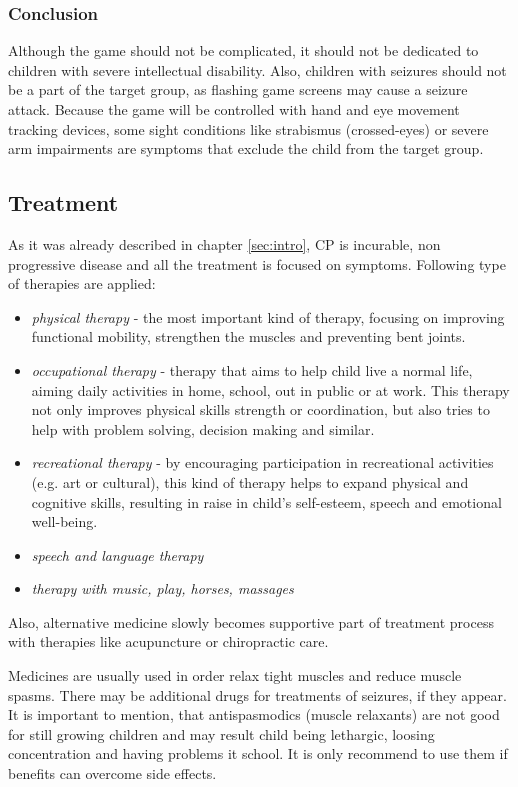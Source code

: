 \subsubsection*{Conclusion}
Although the game should not be complicated, it should not be dedicated to children with severe intellectual disability. Also, children with seizures should not be a part of the target group, as flashing game screens may cause a seizure attack. Because the game will be controlled with hand and eye movement tracking devices, some sight conditions like strabismus (crossed-eyes) or severe arm impairments are symptoms that exclude the child from the target group.

\subsection{Treatment}
As it was already described in chapter \ref{sec:intro}, CP is incurable, non progressive disease and all the treatment is focused on symptoms. Following type of therapies are applied:
\begin{itemize}
\item \emph{physical therapy} - the most important kind of therapy, focusing on improving functional mobility, strengthen the muscles and preventing bent joints.
\item \emph{occupational therapy} - therapy that aims to help child live a normal life, aiming daily activities in home, school, out in public or at work. This therapy not only improves physical skills strength or coordination, but also tries to help with problem solving, decision making and similar.
\item \emph{recreational therapy} - by encouraging participation in recreational activities	(e.g. art or cultural), this kind of therapy helps to expand physical and cognitive skills, resulting in raise in child's self-esteem, speech and emotional well-being.
\item \emph{speech and language therapy}
\item \emph{therapy with music, play, horses, massages}
\end{itemize}

Also, alternative medicine slowly becomes supportive part of treatment process with therapies like acupuncture or chiropractic care. 

Medicines are usually used in order relax tight muscles and reduce muscle spasms. There may be additional drugs for treatments of seizures, if they appear. It is important to mention, that antispasmodics (muscle relaxants) are not good for still growing children and may result child being lethargic, loosing concentration and having problems it school. It is only recommend to use them if benefits can overcome side effects. 

